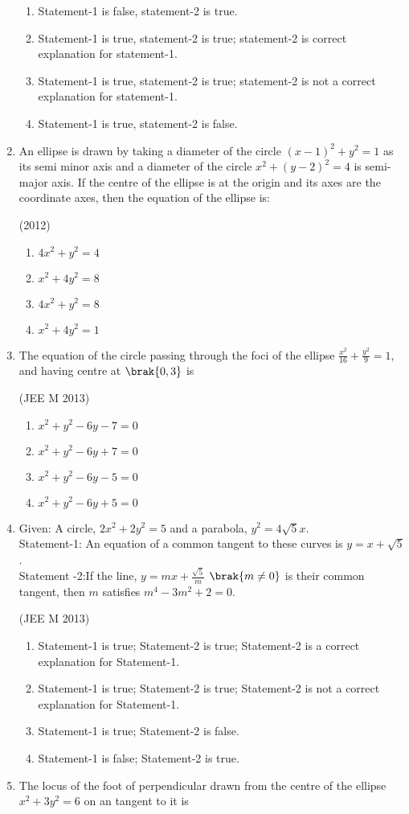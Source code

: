 \documentclass[journal,12pt,twocolumn]{IEEEtran}
\theoremstyle{remark}
\begin{document}
\begin{enumerate}
\begin{enumerate}
    \item Statement-1 is false, statement-2 is true.
    \item Statement-1 is true,  statement-2 is true; statement-2 is correct explanation for statement-1.
    \item Statement-1 is true, statement-2 is true; statement-2 is not a correct explanation for statement-1.
    \item Statement-1 is true, statement-2 is false.
\end{enumerate}
\item An ellipse is drawn by taking a diameter of the circle $(x-1)^2+y^2=1$ as its semi minor axis and a diameter of the circle $x^2+(y-2)^2=4$ is semi-major axis. If the centre of the ellipse is at the origin and its axes are the coordinate axes, then the equation of the ellipse is: 

\hfill(2012)
\begin{enumerate}
    \item $4x^2+y^2=4$ 
    \item $x^2+4y^2=8$
    \item $4x^2+y^2=8$
    \item $x^2+4y^2=1$
\end{enumerate}
\item The equation of the circle passing through the foci of the ellipse $\frac{x^2}{16}+\frac{y^2}{9}=1$, and having centre at $\brak{0,3}$ is

\hfill(JEE M 2013)
\begin{enumerate}
    \item $x^2+y^2-6y-7=0$
    \item $x^2+y^2-6y+7=0$
    \item $x^2+y^2-6y-5=0$
    \item $x^2+y^2-6y+5=0$
\end{enumerate}
\item {Given: A circle, $2x^2+2y^2=5$ and a parabola, $y^2=4\sqrt{5}x$.\\
Statement-1: An equation of a common tangent to these curves is $y=x+\sqrt{5}$.\\
Statement -2:If the line, $y=mx+\frac{\sqrt{5}}{m}$ $\brak{m \neq 0}$ is their common tangent, then $m$ satisfies $m^4-3m^2+2=0$.}

\hfill(JEE M 2013)
\begin{enumerate}
    \item Statement-1 is true; Statement-2 is true; Statement-2 is a correct explanation for Statement-1.
    \item Statement-1 is true; Statement-2 is true; Statement-2 is not a correct explanation for Statement-1.
    \item Statement-1 is true; Statement-2 is false.
    \item Statement-1 is false; Statement-2 is true.
\end{enumerate}
\item The locus of the foot of perpendicular drawn from the centre of the ellipse $x^2+3y^2=6$ on an tangent to it is


\end{enumerate}
\end{document}
